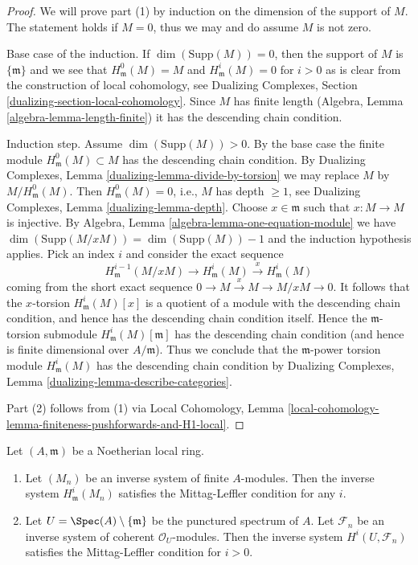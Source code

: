 \begin{proof}
We will prove part (1) by induction on the dimension of the support of $M$.
The statement holds if $M = 0$, thus we may and do assume $M$ is not zero.

\medskip\noindent
Base case of the induction.
If $\dim(\text{Supp}(M)) = 0$, then the support
of $M$ is $\{\mathfrak m\}$ and we see that $H^0_\mathfrak m(M) = M$
and $H^i_\mathfrak m(M) = 0$ for $i > 0$ as is clear from the
construction of local cohomology, see
Dualizing Complexes, Section \ref{dualizing-section-local-cohomology}.
Since $M$ has finite length (Algebra, Lemma \ref{algebra-lemma-length-finite})
it has the descending chain condition.

\medskip\noindent
Induction step. Assume $\dim(\text{Supp}(M)) > 0$.
By the base case the finite module $H^0_\mathfrak m(M) \subset M$
has the descending chain condition.
By Dualizing Complexes, Lemma \ref{dualizing-lemma-divide-by-torsion}
we may replace $M$ by $M/H^0_\mathfrak m(M)$.
Then $H^0_\mathfrak m(M) = 0$, i.e., $M$ has depth $\geq 1$, see
Dualizing Complexes, Lemma \ref{dualizing-lemma-depth}.
Choose $x \in \mathfrak m$ such that $x : M \to M$ is injective.
By Algebra, Lemma \ref{algebra-lemma-one-equation-module} we have
$\dim(\text{Supp}(M/xM)) = \dim(\text{Supp}(M)) - 1$ and the
induction hypothesis applies. Pick an index $i$ and consider the
exact sequence
$$
H^{i - 1}_\mathfrak m(M/xM) \to H^i_\mathfrak m(M) \xrightarrow{x}
H^i_\mathfrak m(M)
$$
coming from the short exact sequence $0 \to M \xrightarrow{x} M \to M/xM \to 0$.
It follows that the $x$-torsion $H^i_\mathfrak m(M)[x]$
is a quotient of a module with the descending chain condition, and
hence has the descending chain condition itself. Hence the
$\mathfrak m$-torsion submodule $H^i_\mathfrak m(M)[\mathfrak m]$ has
the descending chain condition (and hence is finite dimensional
over $A/\mathfrak m$). Thus we conclude that the $\mathfrak m$-power
torsion module $H^i_\mathfrak m(M)$ has the descending chain
condition by Dualizing Complexes, Lemma
\ref{dualizing-lemma-describe-categories}.

\medskip\noindent
Part (2) follows from (1) via Local Cohomology,
Lemma \ref{local-cohomology-lemma-finiteness-pushforwards-and-H1-local}.
\end{proof}

\begin{lemma}
\label{lemma-ML-local}
Let $(A, \mathfrak m)$ be a Noetherian local ring.
\begin{enumerate}
\item Let $(M_n)$ be an inverse system of finite $A$-modules. Then the
inverse system $H^i_\mathfrak m(M_n)$ satisfies the Mittag-Leffler
condition for any $i$.
\item Let $U = \Spec(A) \setminus \{\mathfrak m\}$ be the
punctured spectrum of $A$.
Let $\mathcal{F}_n$ be an inverse system of
coherent $\mathcal{O}_U$-modules.
Then the inverse system $H^i(U, \mathcal{F}_n)$
satisfies the Mittag-Leffler condition for $i > 0$.
\end{enumerate}
\end{lemma}

